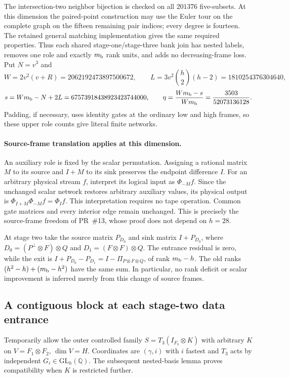 The intersection-two neighbor bijection is checked on all $201376$
five-subsets. At this dimension the paired-point construction may use the
Euler tour on the complete graph on the fifteen remaining pair indices;
every degree is fourteen. The retained general matching implementation gives
the same required properties. Thus each shared stage-one/stage-three bank
join has nested labels, removes one role and exactly $m_{\rm b}$ rank units,
and adds no decreasing-frame loss. Put $N=v^3$ and
\[
 W=2v^2(v+R)=2062192473897500672,
 \qquad L=3v^2\binom h2(h-2)=1810254376304640,
\]
\[
 s=Wm_{\rm b}-N+2L=67573918438923423744000,
 \qquad \eta=\frac{Wm_{\rm b}-s}{Wm_{\rm b}}
             =\frac{3503}{52073136128}.
\]
Padding, if necessary, uses identity gates at the ordinary low and high
frames, so these upper role counts give literal finite networks.

\paragraph{Source-frame translation applies at this dimension.}
An auxiliary role is fixed by the scalar permutation. Assigning a rational
matrix $M$ to its source and $I+M$ to its sink preserves the endpoint
difference $I$. For an arbitrary physical stream $f$, interpret its logical
input as $\Phi_{-M}f$. Since the unchanged scalar network restores arbitrary
auxiliary values, its physical output is
$\Phi_{I+M}\Phi_{-M}f=\Phi_I f$. This interpretation requires no tape
operation. Common gate matrices and every interior edge remain unchanged.
This is precisely the source-frame freedom of PR~\#13, whose proof does
not depend on $h=28$.

At stage two take the source matrix $P_{D_0}$ and sink matrix $I+P_{D_0}$,
where $D_0=(P^\perp\otimes F)\otimes Q$ and
$D_1=(F\otimes F)\otimes Q$. The entrance residual is zero, while the
exit is $I+P_{D_0}-P_{D_1}=I-\Pi_{P\otimes F\otimes Q}$, of rank
$m_{\rm b}-h$. The old ranks $(h^2-h)+(m_{\rm b}-h^2)$ have the same sum.
In particular, no rank deficit or scalar improvement is inferred merely
from this change of source frames.

\subsection{A contiguous block at each stage-two data entrance}
\label{sec:nested-data-entrance}

Temporarily allow the outer controlled family
$S=T_3(I_{F_3}\otimes K)$ with arbitrary $K$ on
$V=F_1\otimes F_2$, $\dim V=H$. Coordinates are $(\gamma,i)$ with $i$
fastest and $T_3$ acts by independent $G_i\in\mathrm{GL}_h(\mathbb Q)$.
The subsequent nested-basis lemma proves compatibility when $K$ is restricted
further.

